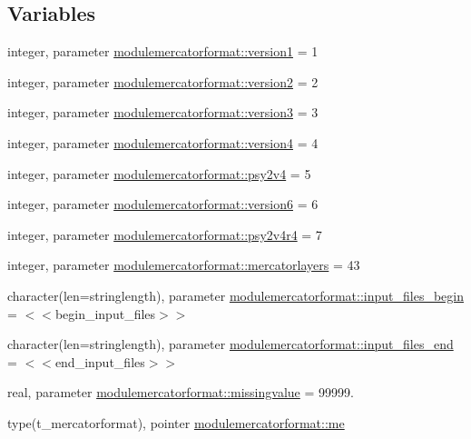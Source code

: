\subsection*{Variables}
\begin{DoxyCompactItemize}
\item 
integer, parameter \mbox{\hyperlink{namespacemodulemercatorformat_afd6a3e2f81f1b7519f09679d2a4b32a5}{modulemercatorformat\+::version1}} = 1
\item 
integer, parameter \mbox{\hyperlink{namespacemodulemercatorformat_a62b4e03129d00d015ecc68be8b08abc0}{modulemercatorformat\+::version2}} = 2
\item 
integer, parameter \mbox{\hyperlink{namespacemodulemercatorformat_a36f57d98299ecea5041ccb957b845703}{modulemercatorformat\+::version3}} = 3
\item 
integer, parameter \mbox{\hyperlink{namespacemodulemercatorformat_ac816ec8a0895c280424703834af59eae}{modulemercatorformat\+::version4}} = 4
\item 
integer, parameter \mbox{\hyperlink{namespacemodulemercatorformat_a5cabeaba108a40c83eac8f53a160106f}{modulemercatorformat\+::psy2v4}} = 5
\item 
integer, parameter \mbox{\hyperlink{namespacemodulemercatorformat_ade9a7add1396b3abaf38515d54b29c3a}{modulemercatorformat\+::version6}} = 6
\item 
integer, parameter \mbox{\hyperlink{namespacemodulemercatorformat_a033048289283175ff5dbfdcc172a4949}{modulemercatorformat\+::psy2v4r4}} = 7
\item 
integer, parameter \mbox{\hyperlink{namespacemodulemercatorformat_a7bfebe3c1bfb641a6fcfbee0b393ba66}{modulemercatorformat\+::mercatorlayers}} = 43
\item 
character(len=stringlength), parameter \mbox{\hyperlink{namespacemodulemercatorformat_af90631169c39b6d088c77e6f297ec8dc}{modulemercatorformat\+::input\+\_\+files\+\_\+begin}} = \textquotesingle{}$<$$<$begin\+\_\+input\+\_\+files$>$$>$\textquotesingle{}
\item 
character(len=stringlength), parameter \mbox{\hyperlink{namespacemodulemercatorformat_ae3f030fbb07cb4b74b032f395b9e7482}{modulemercatorformat\+::input\+\_\+files\+\_\+end}} = \textquotesingle{}$<$$<$end\+\_\+input\+\_\+files$>$$>$\textquotesingle{}
\item 
real, parameter \mbox{\hyperlink{namespacemodulemercatorformat_a091a5b0220afeb3dc3af915b1287f4f3}{modulemercatorformat\+::missingvalue}} = 99999.
\item 
type(t\+\_\+mercatorformat), pointer \mbox{\hyperlink{namespacemodulemercatorformat_a1749fccffa78db7b38124dc3676b5e7e}{modulemercatorformat\+::me}}
\end{DoxyCompactItemize}
